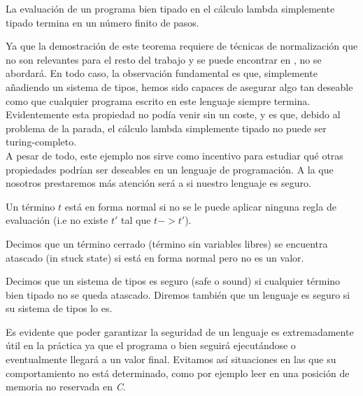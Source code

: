 \begin{theorem}
  La evaluación de un programa bien tipado en el cálculo lambda simplemente tipado termina en un número finito de pasos.
\end{theorem}

Ya que la demostración de este teorema requiere de técnicas de normalización que no son relevantes para el resto del trabajo y se puede encontrar en \cite{TPL}, no se abordará. En todo caso, la observación fundamental es
que, simplemente añadiendo un sistema de tipos, hemos sido capaces de asegurar algo tan deseable como 
que cualquier programa escrito en este lenguaje siempre termina. Evidentemente esta propiedad no podía venir sin
un coste, y es que, debido al problema de la parada, el cálculo lambda simplemente tipado no puede ser turing-completo.\\

A pesar de todo, este ejemplo nos sirve como incentivo para estudiar qué otras propiedades podrían ser deseables
en un lenguaje de programación. A la que nosotros prestaremos más atención será a si nuestro lenguaje es seguro.\\

\begin{definition}
  Un término $t$ está en forma normal si no se le puede aplicar ninguna regla de evaluación (i.e no existe $t'$ tal que $t -> t'$).
\end{definition}

\begin{definition}
  Decimos que un término cerrado (término sin variables libres) se encuentra atascado (in stuck state) si está
  en forma normal pero no es un valor.
\end{definition}

\begin{definition}[Seguridad]
  Decimos que un sistema de tipos es seguro (safe o sound) si cualquier término bien tipado no se queda atascado.
  Diremos también que un lenguaje es seguro si su sistema de tipos lo es.
\end{definition}


Es evidente que poder garantizar la seguridad de un lenguaje es extremadamente útil en la práctica ya que el
programa o bien seguirá ejecutándose o eventualmente llegará a un valor final. Evitamos así situaciones en
las que su comportamiento no está determinado, como por ejemplo leer en una posición de memoria no reservada en \textit{C}.\\

